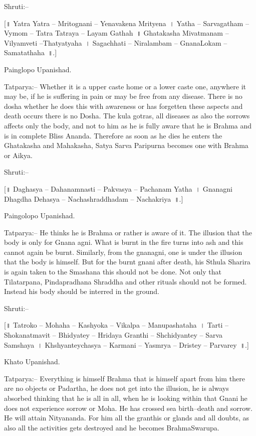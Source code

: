 Shruti:–

[॥ Yatra Yatra – Mritognani – Yenavakena Mrityena~। Yatha – Sarvagatham – Vymom – Tatra Tatraya – Layam Gathah~॥ Ghatakasha Mivatmanam – Vilyamveti –Thatyatyaha~। Sagachhati – Niralambam – GnanaLokam – Samatathaha~॥.]

Painglopo Upanishad.

Tatparya:– Whether it is a upper caste home or a lower caste one, anywhere it may be, if he is suffering in pain or may be free from any disease. There is no dosha whether he does this with awareness or has forgetten these aspects and death occurs there is no Dosha. The kula gotras, all diseases as also the sorrows affects only the body, and not to him as he is fully aware that he is Brahma and is in complete Bliss Ananda. Therefore as soon as he dies he enters the Ghatakasha and Mahakasha, Satya Sarva Paripurna becomes one with Brahma or Aikya.

Shruti:–

[॥ Daghasya – Dahanamnasti – Pakvasya – Pachanam Yatha~। Gnanagni Dhagdha Dehasya – Nachashraddhadam – Nachakriya~॥.]

Paingolopo Upanishad.

Tatparya:– He thinks he is Brahma or rather is aware of it. The illusion that the body is only for Gnana agni. What is burnt in the fire turns into ash and this cannot again be burnt. Similarly, from the gnanagni, one is under the illusion that the body is himself. But for the burnt gnani after death, his Sthula Sharira is again taken to the Smashana this should not be done. Not only that Tilatarpana, Pindapradhana Shraddha and other rituals should not be formed. Instead his body should be interred in the ground.

Shruti:–

[॥ Tatroko – Mohaha – Kashyoka – Vikalpa – Manupashataha~। Tarti – Shokanatmavit – Bhidyatey – Hridaya Granthi – Shchidyantey – Sarva Samshaya~। Khshyanteychasya – Karmani – Yasmrya – Dristey – Parvarey~॥.]

Khato Upanishad.

Tatparya:– Everything is himself Brahma that is himself apart from him there are no objects or Padartha, he does not get into the illusion, he is always absorbed thinking that he is all in all, when he is looking within that Gnani he does not experience sorrow or Moha. He has crossed sea birth–death and sorrow. He will attain Nityananda. For him all the granthis or glands and all doubts, as also all the activities gets destroyed and he becomes BrahmaSwarupa.

